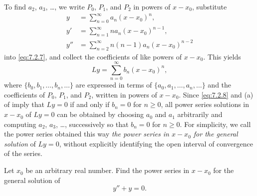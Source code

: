 To find $a_2$, $a_3$, \dots, we write $P_0$, $P_1$, and $P_2$ in powers of
$x-x_0$, substitute
\begin{align*}
y&=\sum^\infty_{n=0}a_n(x-x_0)^n,\\
y'&=\sum^\infty_{n=1}na_n(x-x_0)^{n-1},\\
y''&=\sum^\infty_{n=2}n(n-1)a_n(x-x_0)^{n-2}
\end{align*}
into \eqref{eq:7.2.7}, and collect the coefficients of like powers of
$x-x_0$. This yields
\begin{equation}\label{eq:7.2.8}
Ly=\sum^\infty_{n=0}b_n(x-x_0)^n,
\end{equation}
where $\{b_0, b_1, \dots, b_n, \dots\}$ are expressed in terms of
$\{a_0, a_1, \dots,a_n, \dots\}$ and the coefficients of $P_0$, $P_1$,
and $P_2$, written in powers of $x-x_0$. Since \eqref{eq:7.2.8} and
(a) of  imply that $Ly=0$ if and only if
$b_n=0$ for $n\ge0$,  all power series solutions in
$x-x_0$ of $Ly=0$ can be obtained by choosing $a_0$ and $a_1$
arbitrarily and computing $a_2$, $a_3$, \dots, successively so that
$b_n=0$
for $n\ge0$. For simplicity, we call the power series obtained  this
way \emph{\color{blue}the power series in $x-x_0$ for the general solution} of
$Ly=0$, without explicitly identifying the open interval of
convergence of the series.

\begin{example}\label{example:7.2.1}
Let $x_0$ be an arbitrary real number. Find the power series in
$x-x_0$ for the general solution of
\begin{equation}\label{eq:7.2.9}
 y''+ y=0.
\end{equation}
\end{example}

